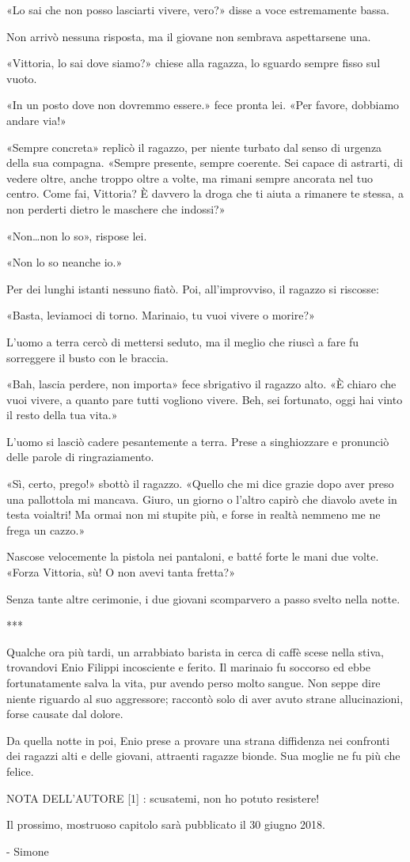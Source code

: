 «Lo sai che non posso lasciarti vivere, vero?» disse a voce estremamente bassa.

Non arrivò nessuna risposta, ma il giovane non sembrava aspettarsene una.

«Vittoria, lo sai dove siamo?» chiese alla ragazza, lo sguardo sempre fisso sul vuoto.

«In un posto dove non dovremmo essere.» fece pronta lei. «Per favore, dobbiamo andare via!»

«Sempre concreta» replicò il ragazzo, per niente turbato dal senso di urgenza della sua compagna. «Sempre presente, sempre coerente. Sei capace di astrarti, di vedere oltre, anche troppo oltre a volte, ma rimani sempre ancorata nel tuo centro. Come fai, Vittoria? È davvero la droga che ti aiuta a rimanere te stessa, a non perderti dietro le maschere che indossi?»

«Non\ldots non lo so», rispose lei.

«Non lo so neanche io.»

Per dei lunghi istanti nessuno fiatò. Poi, all'improvviso, il ragazzo si riscosse:

«Basta, leviamoci di torno. Marinaio, tu vuoi vivere o morire?»

L'uomo a terra cercò di mettersi seduto, ma il meglio che riuscì a fare fu sorreggere il busto con le braccia.

«Bah, lascia perdere, non importa» fece sbrigativo il ragazzo alto. «È chiaro che vuoi vivere, a quanto pare tutti vogliono vivere. Beh, sei fortunato, oggi hai vinto il resto della tua vita.»

L'uomo si lasciò cadere pesantemente a terra. Prese a singhiozzare e pronunciò delle parole di ringraziamento.

«Sì, certo, prego!» sbottò il ragazzo. «Quello che mi dice grazie dopo aver preso una pallottola mi mancava. Giuro, un giorno o l'altro capirò che diavolo avete in testa voialtri! Ma ormai non mi stupite più, e forse in realtà nemmeno me ne frega un cazzo.» 

Nascose velocemente la pistola nei pantaloni, e batté forte le mani due volte. 
«Forza Vittoria, sù! O non avevi tanta fretta?»

Senza tante altre cerimonie, i due giovani scomparvero a passo svelto nella notte.

***

Qualche ora più tardi, un arrabbiato barista in cerca di caffè scese nella stiva, trovandovi Enio Filippi incosciente e ferito. Il marinaio fu soccorso ed ebbe fortunatamente salva la vita, pur avendo perso molto sangue. Non seppe dire niente riguardo al suo aggressore; raccontò solo di aver avuto strane allucinazioni, forse causate dal dolore.

Da quella notte in poi, Enio prese a provare una strana diffidenza nei confronti dei ragazzi alti e delle giovani, attraenti ragazze bionde. Sua moglie ne fu più che felice.

NOTA DELL'AUTORE
[1] : scusatemi, non ho potuto resistere!

Il prossimo, mostruoso capitolo sarà pubblicato il 30 giugno 2018.

- Simone



